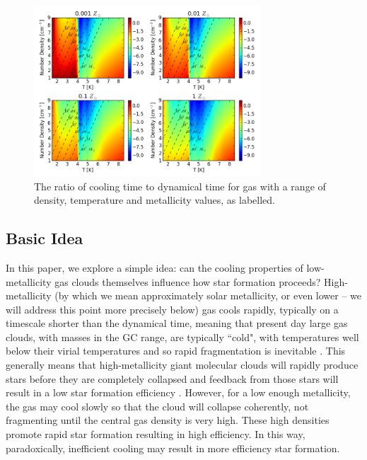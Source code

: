 \documentclass[useAMS,usenatbib]{mn2e}
\begin{document}
\begin{figure}
\begin{center}
\mbox{\includegraphics[width=8.5cm]{Images/cooling_to_freefall_no_background}}
\end{center}
\caption{\label{fig:cooling_to_freefall} The ratio of cooling time to dynamical time for gas with a range of density, temperature and metallicity values, as labelled.}
\end{figure}


%
\subsection{Basic Idea}
\label{sec:basic}

In this paper, we explore a simple idea: can the cooling properties of low-metallicity gas clouds themselves influence how star formation proceeds?  High-metallicity (by which we mean approximately solar metallicity, or even lower -- we will address this point more precisely below) gas cools rapidly, typically on a timescale shorter than the dynamical time, meaning that present day large gas clouds, with masses in the GC range, are typically ``cold", with temperatures well below their virial temperatures and so rapid fragmentation is inevitable \citep{Hoyle1953}.  This generally means that high-metallicity giant molecular clouds will rapidly produce stars before they are completely collapsed and feedback from those stars will result in a low star formation efficiency \citep[e.g.,][]{McKee1989}.  However, for a low enough metallicity, the gas may cool slowly so that the cloud will collapse coherently, not fragmenting until the central gas density is very high.  These high densities promote rapid star formation resulting in high efficiency.  In this way, paradoxically, inefficient cooling may result in more efficiency star formation. 
\end{document}
